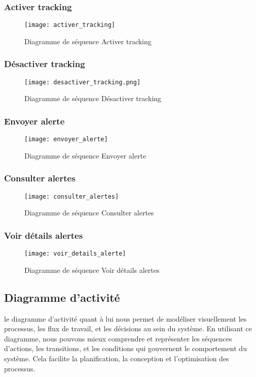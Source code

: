 \subsubsection{Activer tracking}
\begin{figure}[H]
	\texttt{[image: activer\_tracking]}
	\caption{Diagramme de séquence Activer tracking}
\end{figure}

\subsubsection{Désactiver tracking}
\begin{figure}[H]
	\texttt{[image: desactiver\_tracking.png]}
	\caption{Diagramme de séquence Désactiver tracking}
\end{figure}

\subsubsection{Envoyer alerte}
\begin{figure}[H]
	\texttt{[image: envoyer\_alerte]}
	\caption{Diagramme de séquence Envoyer alerte}
\end{figure}

\subsubsection{Consulter alertes}
\begin{figure}[H]
	\texttt{[image: consulter\_alertes]}
	\caption{Diagramme de séquence Consulter alertes}
\end{figure}

\subsubsection{Voir détails alertes}
\begin{figure}[H]
	\texttt{[image: voir\_details\_alerte]}
	\caption{Diagramme de séquence Voir détails alertes}
\end{figure}

\subsection{Diagramme d’activité}
le diagramme d'activité quant à lui nous permet de modéliser visuellement les processus, les flux de travail, et les décisions au sein du système. En utilisant ce diagramme, nous pouvons mieux comprendre et représenter les séquences d'actions, les transitions, et les conditions qui gouvernent le comportement du système. Cela facilite la planification, la conception et l'optimisation des processus.

